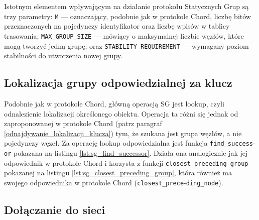 \documentclass[12pt, twoside, openany]{report}
\begin{document}
Istotnym elementem wpływającym na działanie protokołu Statycznych Grup są trzy parametry: \texttt{M} --- oznaczający, podobnie jak w protokole Chord, liczbę bitów przeznaczonych na pojedynczy identyfikator oraz liczbę wpisów w tablicy trasowania; \texttt{MAX\_GROUP\_SIZE} --- mówiący o maksymalnej liczbie węzłów, które mogą tworzyć jedną grupę; oraz \texttt{STABILITY\_REQUIREMENT} --- wymagany poziom stabilności do utworzenia nowej grupy.

\subsection{Lokalizacja grupy odpowiedzialnej za klucz}

Podobnie jak w protokole Chord, główną operacją SG jest lookup, czyli odnalezienie lokalizacji określonego obiektu. Operacja ta różni się jednak od zaproponowanej w protokole Chord (patrz paragraf \ref{odnajdywanie_lokalizacji_klucza}) tym, że szukana jest grupa węzłów, a nie pojedynczy węzeł. Za operację lookup odpowiedzialna jest funkcja \texttt{find\_success}-\texttt{or} pokazana na listingu \ref{lst:sg_find_successor}. Działa ona analogicznie jak jej odpowiednik w protokole Chord i korzysta z funkcji \texttt{closest\_preceding\_group} pokazanej na listingu \ref{lst:sg_closest_preceding_group}, która również ma swojego odpowiednika w protokole Chord (\texttt{closest\_prece}-\texttt{ding\_node}).





\subsection{Dołączanie do sieci}
\label{dolaczanie_do_sieci}
\end{document}
